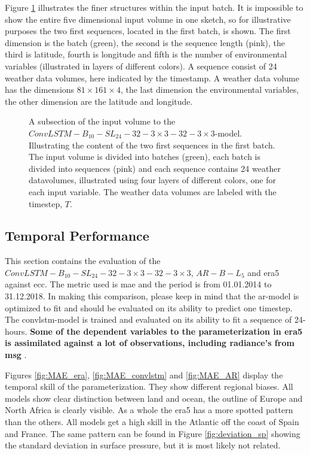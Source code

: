 Figure \ref{fig:input_volume_conv_lstm} illustrates the finer structures within the input batch. It is impossible to show the entire five dimensional input volume in one sketch, so for illustrative purposes the two first sequences, located in the first batch, is shown. The first dimension is the batch (green), the second is the sequence length (pink), the third is latitude, fourth is longitude and fifth is the number of environmental variables (illustrated in layers of different colors). A sequence consist of 24 weather data volumes, here indicated by the timestamp. A weather data volume has the dimensions $81\times161\times4$, the last dimension the environmental variables, the other dimension are the latitude and longitude. 
\begin{figure}
    \centering
    
    \caption{A subsection of the input volume to the $ConvLSTM-B_{10}-SL_{24}-32-3\times3-32-3 \times3$-model. Illustrating the content of the two first sequences in the first batch. The input volume is divided into batches (green), each batch is divided into sequences (pink) and each sequence contains 24 weather datavolumes, illustrated using four layers of different colors, one for each input variable. The weather data volumes are labeled with the timestep, $T$.}
    \label{fig:input_volume_conv_lstm}
\end{figure}


\subsection{Temporal Performance}
This section contains the evaluation of the $ConvLSTM-B_{10}-SL_{24}-32-3\times3-32-3 \times3$, $AR-B-L_5$ and \acrshort{era5} against \acrshort{ecc}. The metric used is \acrshort{mae} and the period is from 01.01.2014 to 31.12.2018. In making this comparison, please keep in mind that the \acrshort{ar}-model is optimized to fit and should be evaluated on its ability to predict one timestep. The \acrshort{convlstm}-model is trained and evaluated on its ability to fit a sequence of 24-hours.\textbf{ Some of the dependent variables to the parameterization in \acrshort{era5} is assimilated against a lot of observations, including radiance's from \acrlong{msg}} \cite{ERA52020}.

Figures \ref{fig:MAE_era}, \ref{fig:MAE_convlstm} and \ref{fig:MAE_AR} display the temporal skill of the parameterization. %
They show different regional biases. All models show clear distinction between land and ocean, the outline of Europe and North Africa is clearly visible.
As a whole the \acrshort{era5} has a more spotted pattern than the others. All models get a high skill in the Atlantic off the coast of Spain and France. The same pattern can be found in Figure \ref{fig:deviation_sp} showing the standard deviation in surface pressure, but it is most likely not related.

